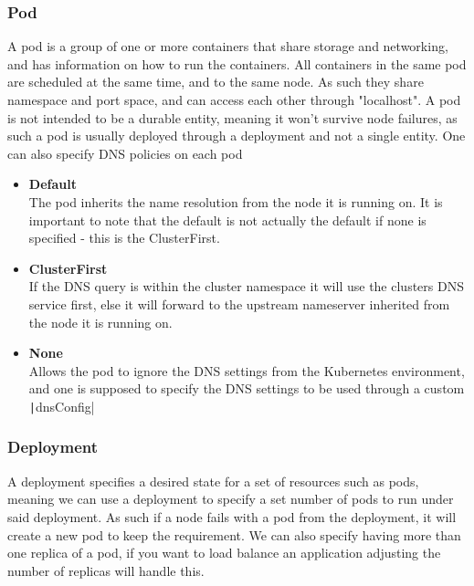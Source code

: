\documentclass[../main.tex]{subfiles}
\begin{document}
\subsubsection*{Pod}
A pod is a group of one or more containers that share storage and networking, and has information on how to run the containers. All containers in the same pod are scheduled at the same time, and to the same node. As such they share namespace and port space, and can access each other through "localhost". \cite{kubernetes_pods} A pod is not intended to be a durable entity, meaning it won't survive node failures, as such a pod is usually deployed through a deployment and not a single entity. One can also specify DNS policies on each pod
\begin{itemize}
    \item \textbf{Default}\\
            The pod inherits the name resolution from the node it is running on. It is important to note that the default is not actually the default if none is specified - this is the ClusterFirst.
    \item\textbf{ClusterFirst}\\
            If the DNS query is within the cluster namespace it will use the clusters DNS service first, else it will forward to the upstream nameserver inherited from the node it is running on.
    \item\textbf{None}\\
            Allows the pod to ignore the DNS settings from the Kubernetes environment, and one is supposed to specify the DNS settings to be used through a custom \texttt|dnsConfig|
\end{itemize}

\subsubsection*{Deployment}
A deployment specifies a desired state for a set of resources such as pods, meaning we can use a deployment to specify a set number of pods to run under said deployment. As such if a node fails with a pod from the deployment, it will create a new pod to keep the requirement. \cite{kubernetes_deployments} We can also specify having more than one replica of a pod, if you want to load balance an application adjusting the number of replicas will handle this.
\end{document}
